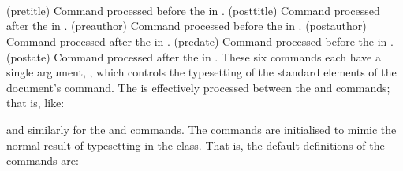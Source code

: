 \begin{syntax}
\cmd{\pretitle} \cmd{\posttitle} \\
\cmd{\preauthor} \cmd{\postauthor} \\
\cmd{\predate} \cmd{\postdate} \\
\end{syntax}
\glossary(pretitle)%
  {}%
  {Command processed before the  in .} 
\glossary(posttitle)%
  {}%
  {Command processed after the  in .} 
\glossary(preauthor)%
  {}%
  {Command processed before the  in .} 
\glossary(postauthor)%
  {}%
  {Command processed after the  in .} 
\glossary(predate)%
  {}%
  {Command processed before the  in .} 
\glossary(postate)%
  {}%
  {Command processed after the  in .} 
These six commands each have a single argument, ,
which controls the typesetting of the 
standard elements of the document's \cmd{\maketitle}
command. The \cmd{\title} is effectively processed between the 
\cmd{\pretitle} and \cmd{\posttitle} commands; that is, like:
\begin{lcode}
{\pretitle \title \posttitle}
\end{lcode}
and similarly for the \cmd{\author} and \cmd{\date} commands. The 
commands are initialised to mimic the normal result of \cmd{\maketitle}
typesetting in the  class.
That is, the default definitions of the commands are:
\begin{lcode}
\pretitle{\begin{center}\LARGE}
\posttitle{\par\end{center}\vskip 0.5em}
\postauthor{\end{tabular}\par\end{center}}
\predate{\begin{center}\large}
\postdate{\par\end{center}}
\end{lcode}

